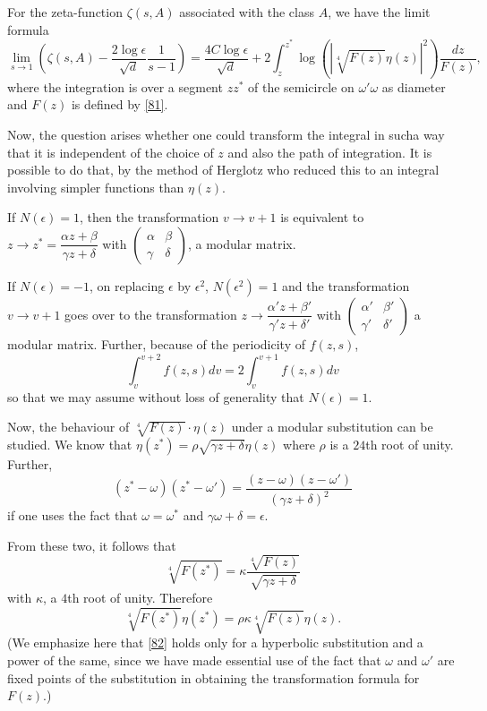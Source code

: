 \begin{thm}[{\bf Hecke}]\label{thm8}
For the zeta-function $\zeta(s,A)$ associated with the class $A$, we
have the limit formula
$$
\lim\limits_{s\to
  1}\left(\zeta(s,A)-\frac{2\log\epsilon}{\sqrt{d}}\frac{1}{s-1}\right)=\frac{4C\log\epsilon}{\sqrt{d}}+2\int^{z^{\ast}}_{z}\log(|\sqrt[4]{F(z)}\eta(z)|^{2})\frac{dz}{F(z)}, 
$$
where the integration is over a segment $zz^{\ast}$ of the semicircle
on $\omega'\omega$ as diameter and $F(z)$ is defined by \eqref{81}.
\end{thm}

Now, the question arises whether one could transform the integral in
such\pageoriginale a way that it is independent of the choice of $z$
and also the path of integration. It is possible to do that, by the
method of Herglotz who reduced this to an integral involving simpler
functions than $\eta(z)$.

If $N(\epsilon)=1$, then the transformation $v\to v+1$ is equivalent
to $z\to z^{\ast}=\dfrac{\alpha z+\beta}{\gamma z+\delta}$ with
$\left(\begin{smallmatrix} \alpha & \beta\\ \gamma & \delta
\end{smallmatrix}\right)$, a modular matrix.

If $N(\epsilon)=-1$, on replacing $\epsilon$ by $\epsilon^{2}$,
$N(\epsilon^{2})=1$ and the transformation $v\to v+1$ goes over to the
transformation $z\to \dfrac{\alpha'z+\beta'}{\gamma'z+\delta'}$ with
$\left(\begin{smallmatrix} \alpha' & \beta'\\ \gamma' & \delta'
\end{smallmatrix}\right)$ a modular matrix. Further, because of the
periodicity of $f(z,s)$,
$$
\int^{v+2}_{v}f(z,s)dv=2\int^{v+1}_{v}f(z,s)dv
$$
so that we may assume without loss of generality that $N(\epsilon)=1$.

Now, the behaviour of $\sqrt[4]{F(z)}\cdot \eta(z)$ under a modular
substitution can be studied. We know that
$\eta(z^{\ast})=\rho\sqrt{\gamma z+\delta}\eta(z)$ where $\rho$ is a
$24$th root of unity. Further,
$$
(z^{\ast}-\omega)(z^{\ast}-\omega')=\frac{(z-\omega)(z-\omega')}{(\gamma
  z+\delta)^{2}} 
$$
if one uses the fact that $\omega=\omega^{\ast}$ and
$\gamma\omega+\delta=\epsilon$. 

From these two, it follows that
$$
\sqrt[4]{F(z^{\ast})}=\kappa\frac{\sqrt[4]{F(z)}}{\sqrt{\gamma
    z+\delta}}
$$
with $\kappa$, a $4$th root of unity. Therefore
\begin{equation*}
\sqrt[4]{F(z^{\ast})}\eta(z^{\ast})=\rho\kappa\sqrt[4]{F(z)}\eta(z).\tag{82}\label{82} 
\end{equation*}
(We emphasize here that \eqref{82} holds only for a hyperbolic
substitution and a power of the same, since we have made essential use
of the fact that $\omega$ and $\omega'$ are fixed points of the
substitution in obtaining the transformation formula for $F(z)$.)

